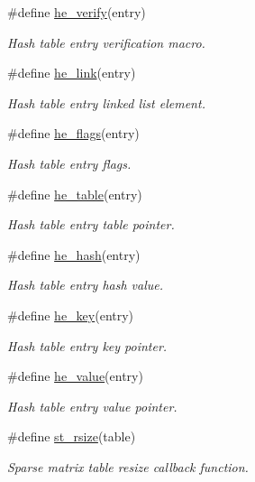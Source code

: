 \begin{CompactItemize}
\#define \hyperlink{group__dbprim__hash_a30}{he\_\-verify}(entry)
\begin{CompactList}\small\item\em Hash table entry verification macro. \item\end{CompactList}\item 
\#define \hyperlink{group__dbprim__hash_a31}{he\_\-link}(entry)
\begin{CompactList}\small\item\em Hash table entry linked list element. \item\end{CompactList}\item 
\#define \hyperlink{group__dbprim__hash_a32}{he\_\-flags}(entry)
\begin{CompactList}\small\item\em Hash table entry flags. \item\end{CompactList}\item 
\#define \hyperlink{group__dbprim__hash_a33}{he\_\-table}(entry)
\begin{CompactList}\small\item\em Hash table entry table pointer. \item\end{CompactList}\item 
\#define \hyperlink{group__dbprim__hash_a34}{he\_\-hash}(entry)
\begin{CompactList}\small\item\em Hash table entry hash value. \item\end{CompactList}\item 
\#define \hyperlink{group__dbprim__hash_a35}{he\_\-key}(entry)
\begin{CompactList}\small\item\em Hash table entry key pointer. \item\end{CompactList}\item 
\#define \hyperlink{group__dbprim__hash_a36}{he\_\-value}(entry)
\begin{CompactList}\small\item\em Hash table entry value pointer. \item\end{CompactList}\item 
\#define \hyperlink{group__dbprim__hash_a37}{st\_\-rsize}(table)
\begin{CompactList}\small\item\em Sparse matrix table resize callback function. \item\end{CompactList}\end{CompactItemize}
